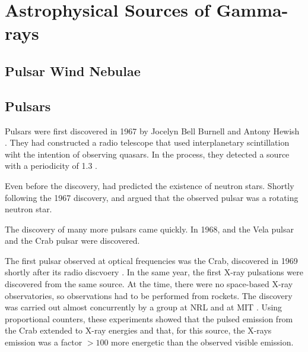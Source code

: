 \section{Astrophysical Sources of Gamma-rays}

\subsection{Pulsar Wind Nebulae}





\subsection{Pulsars}


Pulsars were first discovered in 1967 by Jocelyn Bell Burnell and Antony
Hewish \citep{hewish_1968_observation-rapidly}. They had constructed a
radio telescope that used interplanetary scintillation wiht the intention
of observing quasars.  In the process, they detected a source with a
periodicity of 1.3 \second.

Even before the discovery, \cite{pacini_1967_energy-emission} had predicted
the existence of neutron stars.  Shortly following the 1967 discovery,
\cite{gold_1968_rotating-neutron} and \cite{pacini_1968_rotating-neutron}
argued that the observed pulsar was a rotating neutron star.

The discovery of many more pulsars came quickly.  In 1968, and the
Vela pulsar \citep{large_1968_pulsar-supernova} and the Crab pulsar
\citep{staelin_1968_pulsating-radio} were discovered.

The first pulsar observed at optical frequencies was the
Crab, discovered in 1969 shortly after its radio discvoery
\citep{cocke_1969_discovery-optical}.
In the same year, the first X-ray pulsations were discovered from
the same source. At the time, there were no space-based X-ray
observatories, so observations had to be performed from rockets.
The discovery was carried out almost concurrently by a group
at \ac{NRL} \citep{fritz_1969_x-ray-pulsar} and at \ac{MIT}
\citep{bradt_1969_x-ray-optical}.  Using proportional counters,
these experiments showed that the pulsed emission from 
the Crab extended to X-ray energies and that, for this source,
the X-rays emission was a factor $>100$ more energetic than
the observed visible emission.

